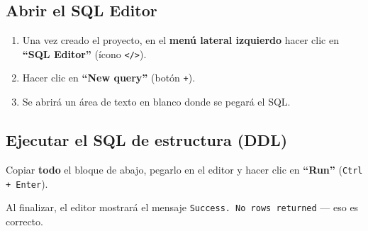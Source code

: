 \documentclass[12pt, a4paper]{article}
\newcommand{\cmd}[1]{\texttt{#1}}
\begin{document}
\subsection{Abrir el SQL Editor}

\begin{enumerate}
    \item Una vez creado el proyecto, en el \textbf{menú lateral izquierdo} hacer clic en \textbf{``SQL Editor''} (ícono \cmd{</>}).
    \item Hacer clic en \textbf{``New query''} (botón \texttt{+}).
    \item Se abrirá un área de texto en blanco donde se pegará el SQL.
\end{enumerate}

\subsection{Ejecutar el SQL de estructura (DDL)}

Copiar \textbf{todo} el bloque de abajo, pegarlo en el editor y hacer clic en \textbf{``Run''} (\texttt{Ctrl + Enter}).

Al finalizar, el editor mostrará el mensaje \cmd{Success. No rows returned} --- eso es correcto.
\end{document}
